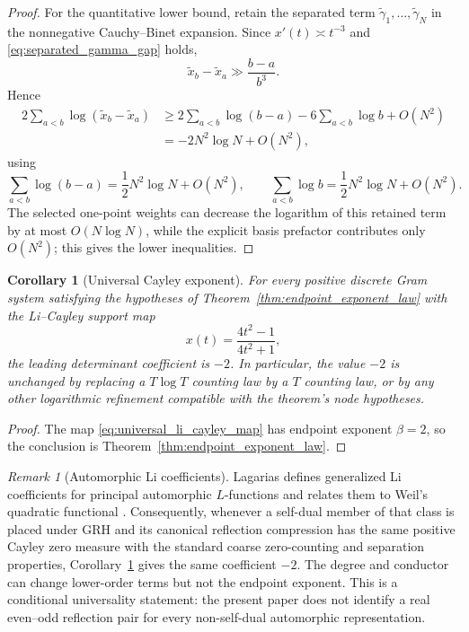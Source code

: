 \documentclass[11pt]{amsart}
\numberwithin{equation}{section}
\theoremstyle{plain}
\newtheorem{corollary}[theorem]{Corollary}
\theoremstyle{definition}
\theoremstyle{remark}
\newtheorem{remark}[theorem]{Remark}
\begin{document}
\begin{proof}
For the quantitative lower bound, retain the separated term $\widetilde\gamma_1,\ldots,\widetilde\gamma_N$ in the nonnegative Cauchy--Binet expansion. Since $x'(t)\asymp t^{-3}$ and \eqref{eq:separated_gamma_gap} holds,
\begin{equation}
\widetilde x_b-\widetilde x_a
\gg\frac{b-a}{b^3}.
\label{eq:regularized_x_gap}
\end{equation}
Hence
\begin{align}
2\sum_{a<b}\log(\widetilde x_b-\widetilde x_a)
&\ge
2\sum_{a<b}\log(b-a)-6\sum_{a<b}\log b+O(N^2)\\
&=-2N^2\log N+O(N^2),
\label{eq:regularized_vandermonde_lower}
\end{align}
using
\begin{equation}
\sum_{a<b}\log(b-a)=\frac12N^2\log N+O(N^2),
\qquad
\sum_{a<b}\log b=\frac12N^2\log N+O(N^2).
\label{eq:pair_log_sums}
\end{equation}
The selected one-point weights can decrease the logarithm of this retained term by at most \(O(N\log N)\), while the explicit basis prefactor contributes only \(O(N^2)\); this gives the lower inequalities.
\end{proof}

\begin{corollary}[Universal Cayley exponent]
\label{cor:universal_cayley_exponent}
For every positive discrete Gram system satisfying the hypotheses of Theorem~\ref{thm:endpoint_exponent_law} with the Li--Cayley support map
\begin{equation}
x(t)=\frac{4t^2-1}{4t^2+1},
\label{eq:universal_li_cayley_map}
\end{equation}
the leading determinant coefficient is $-2$. In particular, the value $-2$ is unchanged by replacing a $T\log T$ counting law by a $T$ counting law, or by any other logarithmic refinement compatible with the theorem's node hypotheses.
\end{corollary}

\begin{proof}
The map \eqref{eq:universal_li_cayley_map} has endpoint exponent $\beta=2$, so the conclusion is Theorem~\ref{thm:endpoint_exponent_law}.
\end{proof}

\begin{remark}[Automorphic Li coefficients]
\label{rem:automorphic_universality}
Lagarias defines generalized Li coefficients for principal automorphic $L$-functions and relates them to Weil's quadratic functional \cite{Lagarias2007}. Consequently, whenever a self-dual member of that class is placed under GRH and its canonical reflection compression has the same positive Cayley zero measure with the standard coarse zero-counting and separation properties, Corollary~\ref{cor:universal_cayley_exponent} gives the same coefficient $-2$. The degree and conductor can change lower-order terms but not the endpoint exponent. This is a conditional universality statement: the present paper does not identify a real even--odd reflection pair for every non-self-dual automorphic representation.
\end{remark}
\end{document}
